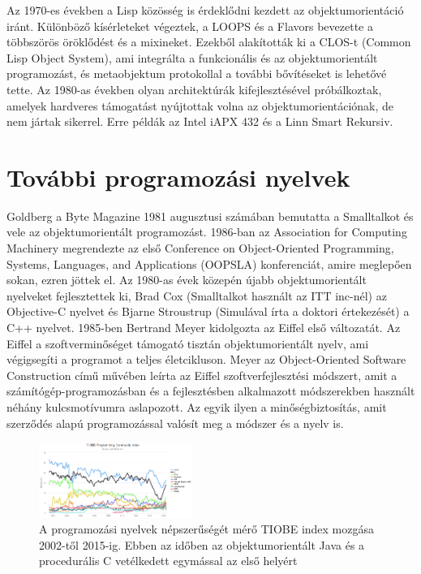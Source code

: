 \documentclass[a4paper,12pt,twoside]{report}
\theoremstyle{definition}
\begin{document}
	Az 1970-es években a Lisp közösség is érdeklődni kezdett az objektumorientáció iránt. Különböző kísérleteket végeztek, a LOOPS és a Flavors bevezette a többszörös öröklődést és a mixineket. Ezekből alakították ki a CLOS-t (Common Lisp Object System), ami integrálta a funkcionális és az objektumorientált programozást, és metaobjektum protokollal a további bővítéseket is lehetővé tette. Az 1980-as években olyan architektúrák kifejlesztésével próbálkoztak, amelyek hardveres támogatást nyújtottak volna az objektumorientációnak, de nem jártak sikerrel. Erre példák az Intel iAPX 432 és a Linn Smart Rekursiv.
	
	\section{További programozási nyelvek}
	
	Goldberg a Byte Magazine 1981 augusztusi számában bemutatta a Smalltalkot és vele az objektumorientált programozást. 1986-ban az Association for Computing Machinery megrendezte az első Conference on Object-Oriented Programming, Systems, Languages, and Applications (OOPSLA) konferenciát, amire meglepően sokan, ezren jöttek el. Az 1980-as évek közepén újabb objektumorientált nyelveket fejlesztettek ki, Brad Cox (Smalltalkot használt az ITT inc-nél) az Objective-C nyelvet és Bjarne Stroustrup (Simulával írta a doktori értekezését) a C++ nyelvet. 1985-ben Bertrand Meyer kidolgozta az Eiffel első változatát. Az Eiffel a szoftverminőséget támogató tisztán objektumorientált nyelv, ami végigsegíti a programot a teljes életcikluson. Meyer az Object-Oriented Software Construction című művében leírta az Eiffel szoftverfejlesztési módszert, amit a számítógép-programozásban és a fejlesztésben alkalmazott módszerekben használt néhány kulcsmotívumra aslapozott. Az egyik ilyen a minőségbiztosítás, amit szerződés alapú programozással valósít meg a módszer és a nyelv is.
	
	\begin{figure} [!ht]
		\centering
		\includegraphics[width=5cm]{Tiobeindex}
		\caption{A programozási nyelvek népszerűségét mérő TIOBE index mozgása 2002-től 2015-ig. Ebben az időben az objektumorientált Java és a procedurális C vetélkedett egymással az első helyért} 
		\label{fig:TIOBE}
	\end{figure}
	
\end{document}
